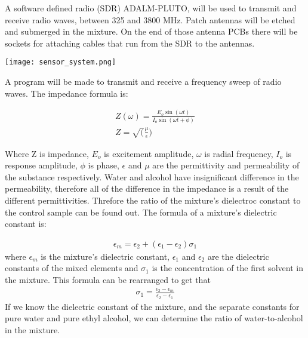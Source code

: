 
A software defined radio (SDR) ADALM-PLUTO, will be used to transmit and receive radio waves, between 325 and 3800 MHz.
Patch antennas will be etched and submerged in the mixture.
On the end of those antenna PCBs there will be sockets for attaching cables that run from the SDR to the antennas.

\begin{center}
    \texttt{[image: sensor\_system.png]}
\end{center}

A program will be made to transmit and receive a frequency sweep of radio waves.
The impedance formula is:


\begin{align}
    Z(\omega) = \frac{E_o \sin(\omega t)}{I_o \sin(\omega t + \phi)} \\
    Z = \sqrt(\frac{\mu}{\epsilon})
\end{align}

Where Z is impedance, $E_o$ is excitement amplitude,
$\omega$ is radial frequency,
$I_o$ is response amplitude,
$\phi$ is phase,
$\epsilon$ and $\mu$ are the permittivity and permeability of the substance respectively.
Water and alcohol have insignificant difference in the permeability, therefore all of the difference in the impedance is a result of the different permittivities.
Threfore the ratio of the mixture's dielectroc constant to the control sample can be found out.
The formula of a mixture's dielectric constant is:

\begin{align}
    \epsilon_m = \epsilon_2 + \left( \epsilon_1 - \epsilon_2 \right) \sigma_1
\end{align}
where $\epsilon_m$ is the mixture's dielectric constant, $\epsilon_1$ and $\epsilon_2$ are the dielectric constants of the mixed elements and $\sigma_1$ is the concentration of the first solvent in the mixture.
This formula can be rearranged to get that
\begin{align}
    \sigma_1 = \frac{\epsilon_2 - \epsilon_m}{\epsilon_2 - \epsilon_1}
\end{align}
If we know the dielectric constant of the mixture, and the separate constants for pure water and pure ethyl alcohol, we can determine the ratio of water-to-alcohol in the mixture.